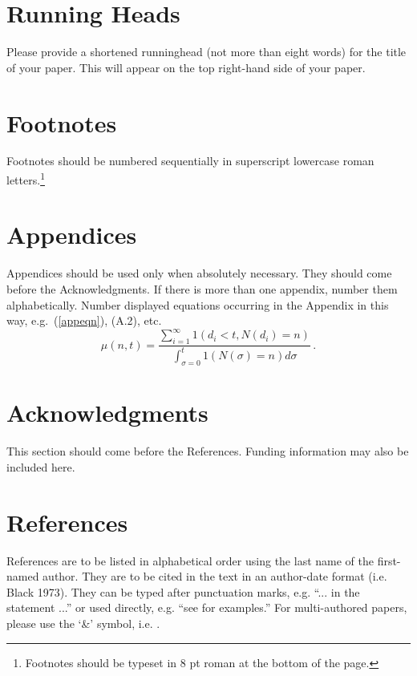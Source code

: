 \documentclass{ws-ijtaf}
\begin{document}
\section{Running Heads}

Please provide a shortened runninghead (not more than eight words) for
the title of your paper. This will appear on the top right-hand side
of your paper.

\section{Footnotes}

Footnotes should be numbered sequentially in superscript
lowercase roman letters.\footnote{Footnotes should be
typeset in 8 pt roman at the bottom of the page.}

\appendix

\section{Appendices}

Appendices should be used only when absolutely necessary. They
should come\break
before the Acknowledgments. If there is more than one
appendix, number them alphabetically. Number displayed equations
occurring in the Appendix in this way, e.g.~(\ref{appeqn}), (A.2), etc.
\begin{equation}
\mu(n, t) = \frac{\sum^\infty_{i=1} 1(d_i < t, N(d_i)
= n)}{\int^t_{\sigma=0} 1(N(\sigma) = n)d\sigma}\,.
\label{appeqn}
\end{equation}

\section*{Acknowledgments}

This section should come before the References. Funding
information may also be included here.

\section*{References}
References are to be listed in alphabetical order using the last name of the first-named author.
They are to be cited in the text in an author-date format (i.e. Black 1973).
They can be typed after punctuation marks, e.g. ``... in the statement \citep{duf01} ...''
or used directly, e.g. ``see \cite{duf01} for examples.''
For multi-authored papers, please use the `\&' symbol, i.e. \cite{del94}.
\end{document}

